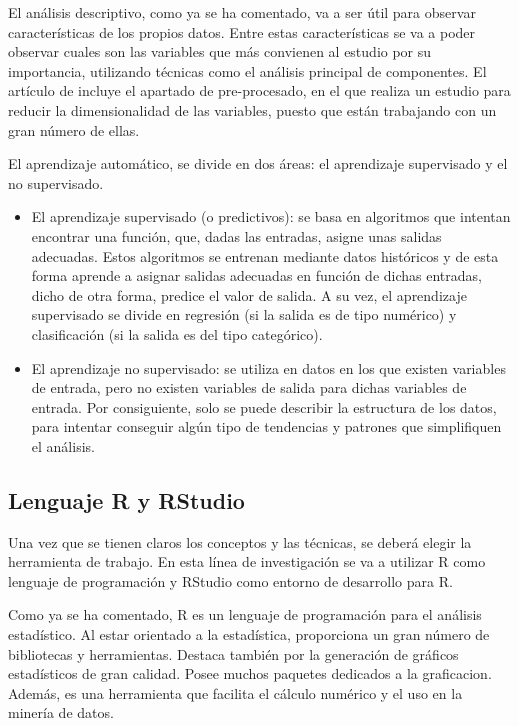 El análisis descriptivo, como ya se ha comentado, va a ser útil para observar características de los propios datos. Entre estas características se va a poder observar cuales son las variables que más convienen al estudio por su importancia, utilizando técnicas como el análisis principal de componentes. El artículo de  incluye el apartado de pre-procesado, en el que realiza un estudio para reducir la dimensionalidad de las variables, puesto que están trabajando con un gran número de ellas.

El aprendizaje automático, se divide en dos áreas: el aprendizaje supervisado y el no supervisado. 

\begin{itemize}
\item El aprendizaje supervisado (o predictivos): se basa en algoritmos que intentan encontrar una función, que, dadas las entradas, asigne unas salidas adecuadas. Estos algoritmos se entrenan mediante datos históricos y de esta forma aprende a asignar salidas adecuadas en función de dichas entradas, dicho de otra forma, predice el valor de salida. A su vez, el aprendizaje supervisado se divide en regresión (si la salida es de tipo numérico) y clasificación (si la salida es del tipo categórico). \cite{Recuero2017}
\item El aprendizaje no supervisado: se utiliza en datos en los que existen variables de entrada, pero no existen variables de salida para dichas variables de entrada. Por consiguiente, solo se puede describir la estructura de los datos, para intentar conseguir algún tipo de tendencias y patrones que simplifiquen el análisis.\cite{Recuero2017} \cite{rodriguez2009herramientas}
\end{itemize}

\subsection{Lenguaje R y RStudio}
Una vez que se tienen claros los conceptos y las técnicas, se deberá elegir la herramienta de trabajo. En esta línea de investigación se va a utilizar R como lenguaje de programación y RStudio como entorno de desarrollo para R.

Como ya se ha comentado, R es un lenguaje de programación para el análisis estadístico. Al estar orientado a la estadística, proporciona un gran número de bibliotecas y herramientas. Destaca también por la generación de gráficos estadísticos de gran calidad. Posee muchos paquetes dedicados a la graficacion. Además, es una herramienta que facilita el cálculo numérico y el uso en la minería de datos. \cite{emanuel2014}


